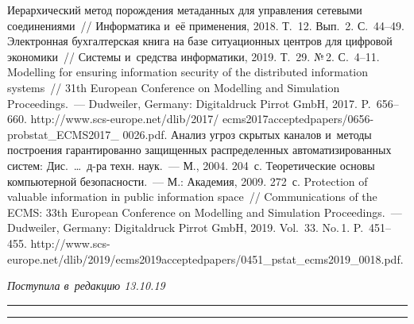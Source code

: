 \begin{multicols}{2}
{{\begin{thebibliography}{99}
 Иерархический метод порождения 
метаданных для управления сетевыми соединениями~// Информатика и~её применения, 2018. 
Т.~12. Вып.~2. С.~44--49.
 Электронная бухгалтерская книга на базе 
ситуационных центров для цифровой экономики~// Системы и~средства информатики, 2019. 
Т.~29. №\,2. С.~4--11.
 Modelling for ensuring information security of 
the distributed information systems~// 31th European Conference on Modelling and Simulation 
Proceedings.~--- Dudweiler, Germany: Digitaldruck Pirrot GmbH, 2017. P.~656--660. {\sf 
http://www.scs-europe.net/dlib/2017/\linebreak  
ecms2017acceptedpapers/0656-probstat\_ECMS2017\_ 0026.pdf}.
 Анализ угроз скрытых каналов и~методы построения гарантированно 
защищенных распределенных автоматизированных систем: Дис.\ \ldots\ д-ра техн. наук.~--- 
М., 2004. 204~с.
 Теоретические основы компьютерной 
безопасности.~--- М.: Академия, 2009. 272~с.
 Protection of valuable 
information in public information space~// Communications of the ECMS: 33th European Conference 
on Modelling and Simulation Proceedings.~--- 
Dudweiler, Germany: Digitaldruck Pirrot GmbH, 2019. 
Vol.~33. No.\,1. P.~451--455. 
{\sf 
http://www.scs-europe.net/dlib/2019/ecms2019acceptedpapers/0451\_\linebreak pstat\_ecms2019\_0018.pdf}.
 \end{thebibliography}

 }
 }

\end{multicols}

\vspace*{-6pt}

\hfill{\small\textit{Поступила в~редакцию 13.10.19}}

\vspace*{8pt}




\hrule

\vspace*{2pt}

\hrule

